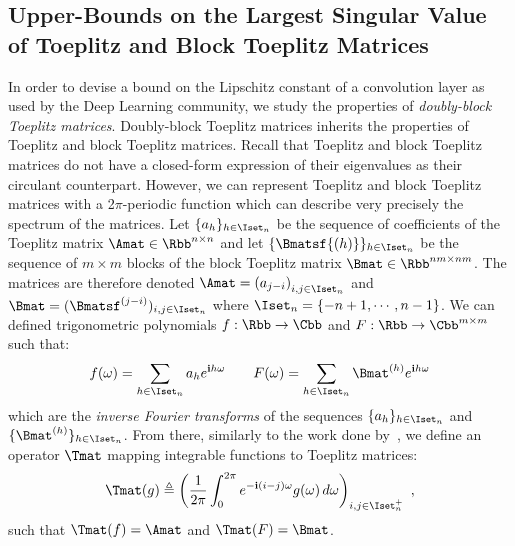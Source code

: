 \subsection{Upper-Bounds on the Largest Singular Value of Toeplitz and Block Toeplitz Matrices}
\label{subsection:ch5-upper_bounds_on_the_largest_singular_value_of_toeplitz_and_block_toeplitz_matrices}

In order to devise a bound on the Lipschitz constant of a convolution layer as used by the Deep Learning community, we study the properties of \emph{doubly-block Toeplitz matrices}. 
Doubly-block Toeplitz matrices inherits the properties of Toeplitz and block Toeplitz matrices.
Recall that Toeplitz and block Toeplitz matrices do not have a closed-form expression of their eigenvalues as their circulant counterpart.
However, we can represent Toeplitz and block Toeplitz matrices with a 2$\pi$-periodic function which can describe very precisely the spectrum of the matrices. 
Let $\{a_h\}_{h \in \Iset_n}$ be the sequence of coefficients of the Toeplitz matrix $\Amat \in \Rbb^{n \times n}$ and let $\{\Bmatsf{(h)}\}_{h \in \Iset_n}$ be the sequence of $m \times m$ blocks of the block Toeplitz matrix $\Bmat \in \Rbb^{nm \times nm}$.
The matrices are therefore denoted $\Amat = \leftmat a_{j-i} \rightmat_{i,j \in \Iset_n}$ and $\Bmat = ( \Bmatsf^{(j-i)} )_{i,j \in \Iset_n}$ where $\Iset_n = \left\{ -n+1, \cdots, n-1 \right\}$.
We can defined trigonometric polynomials $f: \Rbb \rightarrow \Cbb$ and $F: \Rbb \rightarrow \Cbb^{m \times m}$ such that:
\begin{equation}
  f(\omega) = \sum_{h \in \Iset_n} a_h e^{\ci h \omega} \quad \quad  F(\omega) = \sum_{h \in \Iset_n} \Bmat^{(h)} e^{\ci h \omega}
\end{equation}
which are the \emph{inverse Fourier transforms} of the sequences $\{a_h\}_{h \in \Iset_n}$ and $\{\Bmat^{(h)}\}_{h \in \Iset_n}$.
From there, similarly to the work done by~\citet{grenander1958toeplitz}, we define an operator $\Tmat$ mapping integrable functions to Toeplitz matrices:
\begin{equation} \label{equation:expression_toeplitz_matrix}
  \Tmat(g) \triangleq\leftmat\frac{1}{2\pi}\int_{0}^{2\pi}e^{-\ci(i-j)\omega}g(\omega)\,d\omega\rightmat_{i,j \in \Iset^+_n} \enspace,
\end{equation}
such that $\Tmat(f) = \Amat$ and $\Tmat(F) = \Bmat$.


